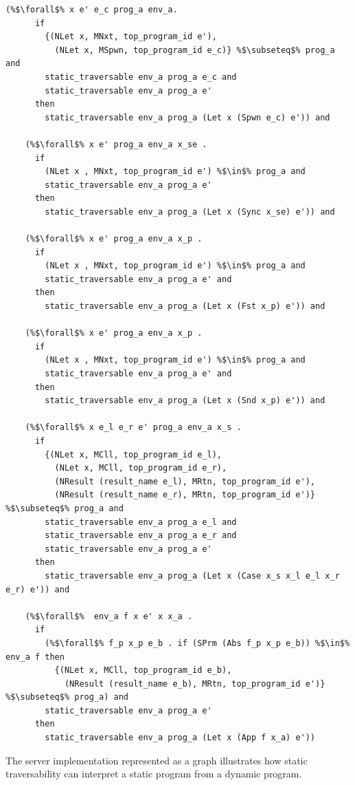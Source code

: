 \documentclass{article}
\begin{document}
\begin{lstlisting}[language=logic, escapechar=\%]
    (%$\forall$% x e' e_c prog_a env_a.
      if
        {(NLet x, MNxt, top_program_id e'),
          (NLet x, MSpwn, top_program_id e_c)} %$\subseteq$% prog_a and
        static_traversable env_a prog_a e_c and
        static_traversable env_a prog_a e'
      then
        static_traversable env_a prog_a (Let x (Spwn e_c) e')) and

    (%$\forall$% x e' prog_a env_a x_se .
      if
        (NLet x , MNxt, top_program_id e') %$\in$% prog_a and
        static_traversable env_a prog_a e'
      then
        static_traversable env_a prog_a (Let x (Sync x_se) e')) and

    (%$\forall$% x e' prog_a env_a x_p .
      if
        (NLet x , MNxt, top_program_id e') %$\in$% prog_a and
        static_traversable env_a prog_a e' and
      then
        static_traversable env_a prog_a (Let x (Fst x_p) e')) and

    (%$\forall$% x e' prog_a env_a x_p .
      if
        (NLet x , MNxt, top_program_id e') %$\in$% prog_a and
        static_traversable env_a prog_a e' and
      then
        static_traversable env_a prog_a (Let x (Snd x_p) e')) and

    (%$\forall$% x e_l e_r e' prog_a env_a x_s .
      if
        {(NLet x, MCll, top_program_id e_l),
          (NLet x, MCll, top_program_id e_r),
          (NResult (result_name e_l), MRtn, top_program_id e'),
          (NResult (result_name e_r), MRtn, top_program_id e')} %$\subseteq$% prog_a and
        static_traversable env_a prog_a e_l and
        static_traversable env_a prog_a e_r and
        static_traversable env_a prog_a e'
      then
        static_traversable env_a prog_a (Let x (Case x_s x_l e_l x_r e_r) e')) and

    (%$\forall$%  env_a f x e' x x_a .
      if
        (%$\forall$% f_p x_p e_b . if (SPrm (Abs f_p x_p e_b)) %$\in$% env_a f then 
          {(NLet x, MCll, top_program_id e_b),
            (NResult (result_name e_b), MRtn, top_program_id e')} %$\subseteq$% prog_a) and
        static_traversable env_a prog_a e'
      then
        static_traversable env_a prog_a (Let x (App f x_a) e'))
  \end{lstlisting}

The server implementation represented as a graph illustrates how static traversability can interpret
a static program from a dynamic program.
\end{document}
